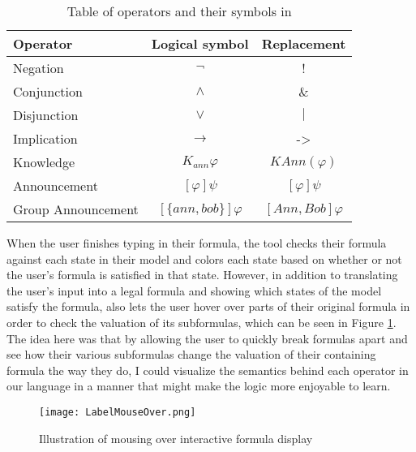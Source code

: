 \begin{table}[H]
\centering
\begin{tabular}{@{}lcc@{}}
\toprule
Operator           & Logical symbol & Replacement     \\  \midrule
Negation           &       $\neg$         & !               \\
Conjunction       &      $\wedge$          & $\&$              \\
Disjunction        &    $\vee$        & $|$               \\
Implication        &       $\rightarrow$       & -\textgreater{} \\
Knowledge         &        $K_{ann}\varphi$        & $KAnn(\varphi)$            \\
Announcement   &       $[\varphi]\psi$         &  $[\varphi]\psi$     \\
Group Announcement &  $[\{ann,bob\}]\varphi$  & $[Ann,Bob]\varphi$ \\ \bottomrule
\end{tabular}%
\caption{Table of operators and their symbols in \cname{}}
\label{tbl:symbolReplacements}
\end{table}



When the user finishes typing in their formula, the tool checks their formula against each state in their model and colors each state based on whether or not the user's formula is satisfied in that state. However, in addition to translating the user's input into a legal formula and showing which states of the model satisfy the formula, \cname{} also lets the user hover over parts of their original formula in order to check the valuation of its subformulas, which can be seen in Figure \ref{fig:labelHover}. The idea here was that by allowing the user to quickly break formulas apart and see how their various subformulas change the valuation of their containing formula the way they do, I could visualize the semantics behind each operator in our language in a manner that might make the logic more enjoyable to learn. 

\begin{figure}[H]
	\texttt{[image: LabelMouseOver.png]}
	\caption{Illustration of mousing over interactive formula display}	
	\label{fig:labelHover}
\end{figure}



